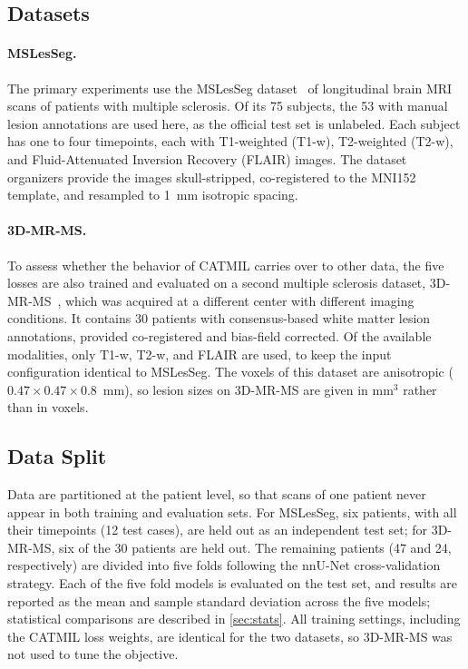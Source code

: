 \subsection{Datasets}

\paragraph{MSLesSeg.}
The primary experiments use the MSLesSeg
dataset~\cite{guarnera_mslesseg_2025} of longitudinal brain MRI scans of
patients with multiple sclerosis. Of its 75 subjects, the 53 with manual
lesion annotations are used here, as the official test set is unlabeled.
Each subject has one to four timepoints, each with T1-weighted (T1-w),
T2-weighted (T2-w), and Fluid-Attenuated Inversion Recovery (FLAIR)
images. The dataset organizers provide the images skull-stripped,
co-registered to the MNI152 template, and resampled to 1~mm isotropic
spacing.

\paragraph{3D-MR-MS.}
To assess whether the behavior of CATMIL carries over to other data, the
five losses are also trained and evaluated on a second multiple sclerosis
dataset, 3D-MR-MS~\cite{lesjak_novel_2018}, which was acquired at a
different center with different imaging conditions. It contains 30
patients with consensus-based white matter lesion annotations, provided
co-registered and bias-field corrected. Of the available modalities, only
T1-w, T2-w, and FLAIR are used, to keep the input configuration identical
to MSLesSeg. The voxels of this dataset are anisotropic
($0.47 \times 0.47 \times 0.8$~mm), so lesion sizes on 3D-MR-MS are given
in mm$^3$ rather than in voxels.

\subsection{Data Split}

Data are partitioned at the patient level, so that scans of one patient
never appear in both training and evaluation sets. For MSLesSeg, six
patients, with all their timepoints (12 test cases), are held out as an
independent test set; for 3D-MR-MS, six of the 30 patients are held out.
The remaining patients (47 and 24, respectively) are divided into five
folds following the nnU-Net cross-validation strategy. Each of the five
fold models is evaluated on the test set, and results are reported as the
mean and sample standard deviation across the five models; statistical
comparisons are described in \cref{sec:stats}. All training
settings, including the CATMIL loss weights, are identical for the two
datasets, so 3D-MR-MS was not used to tune the objective.

